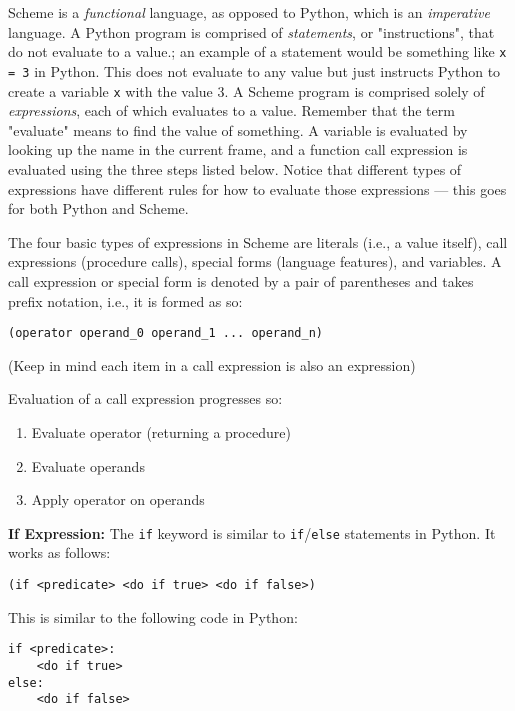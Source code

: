 
Scheme is a \textit{functional} language, as opposed to Python, which is an \textit{imperative} language. A Python program is comprised of \textit{statements}, or "instructions", that do not evaluate to a value.; an example of a statement would be something like \lstinline{x = 3} in Python. This does not evaluate to any value but just instructs Python to create a variable \lstinline{x} with the value 3. A Scheme program is comprised solely of \textit{expressions}, each of which evaluates to a value. Remember that the term "evaluate" means to find the value of something. A variable is evaluated by looking up the name in the current frame, and a function call expression is evaluated using the three steps listed below. Notice that different types of expressions have different rules for how to evaluate those expressions --- this goes for both Python and Scheme.

The four basic types of expressions in Scheme are literals (i.e., a value itself), call expressions (procedure calls), special forms (language features), and variables.  A call expression or special form is denoted by a pair of parentheses and takes prefix notation, i.e., it is formed as so:
\vspace{0.5mm}
\begin{lstlisting}
(operator operand_0 operand_1 ... operand_n)
\end{lstlisting}

(Keep in mind each item in a call expression is also an expression)

Evaluation of a call expression progresses so:
\begin{enumerate}
\item Evaluate operator (returning a procedure)
\item Evaluate operands
\item Apply operator on operands
\end{enumerate}

\newpage

\textbf{If Expression: }
The \lstinline{if} keyword is similar to \lstinline{if}/\lstinline{else} statements in Python. It works as follows:

\begin{lstlisting}
(if <predicate> <do if true> <do if false>)
\end{lstlisting}

This is similar to the following code in Python:

\begin{lstlisting}
if <predicate>:
    <do if true>
else:
    <do if false>
\end{lstlisting}

